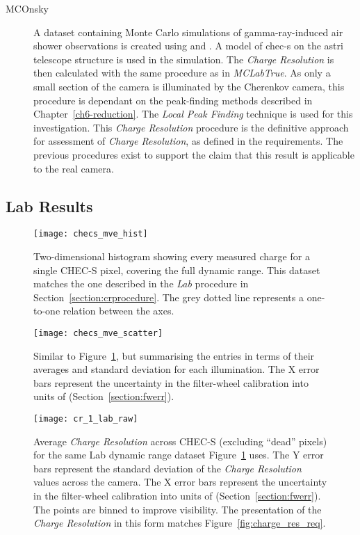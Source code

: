 \begin{description}
\item [MCOnsky] A dataset containing Monte Carlo simulations of gamma-ray-induced air shower observations is created using  and . A model of \gls{chec-s} on the \gls{astri} telescope structure is used in the simulation. The \textit{Charge Resolution} is then calculated with the same procedure as in \textit{MCLabTrue}. As only a small section of the camera is illuminated by the Cherenkov camera, this procedure is dependant on the peak-finding methods described in Chapter~\ref{ch6-reduction}. The \textit{Local Peak Finding} technique is used for this investigation. This \textit{Charge Resolution} procedure is the definitive approach for assessment of \textit{Charge Resolution}, as defined in the requirements. The previous procedures exist to support the claim that this result is applicable to the real camera.
\end{description}

\subsection{Lab Results}

\begin{figure}
	\centering
    \texttt{[image: checs\_mve\_hist]} 
	\caption[CHEC-S measured charge versus average expected charge.]{Two-dimensional histogram showing every measured charge for a single CHEC-S pixel, covering the full dynamic range. This dataset matches the one described in the \textit{Lab} procedure in Section~\ref{section:crprocedure}. The grey dotted line represents a one-to-one relation between the axes.}
	\label{fig:checs_mve_hist}
\end{figure}

\begin{figure}
	\centering
    \texttt{[image: checs\_mve\_scatter]} 
	\caption[CHEC-S average measured charge versus average expected charge.]{Similar to Figure~\ref{fig:checs_mve_hist}, but summarising the entries in terms of their averages and standard deviation for each illumination. The X error bars represent the uncertainty in the filter-wheel calibration into units of \si{\pe} (Section~\ref{section:fwerr}).}
	\label{fig:checs_mve_scatter}
\end{figure}

\begin{figure}
	\centering
    \texttt{[image: cr\_1\_lab\_raw]} 
	\caption[\textit{Charge Resolution} of the Lab dataset in default units.]{Average \textit{Charge Resolution} across CHEC-S (excluding ``dead'' pixels) for the same Lab dynamic range dataset Figure~\ref{fig:checs_mve_hist} uses. The Y error bars represent the standard deviation of the \textit{Charge Resolution} values across the camera. The X error bars represent the uncertainty in the filter-wheel calibration into units of \si{\pe} (Section~\ref{section:fwerr}). The points are binned to improve visibility. The presentation of the \textit{Charge Resolution} in this form matches Figure~\ref{fig:charge_res_req}.}
	\label{fig:cr_1_lab_raw}
\end{figure}

